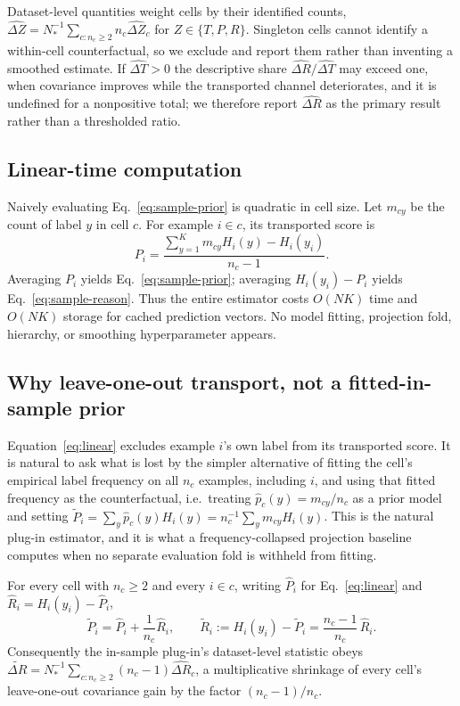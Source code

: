Dataset-level quantities weight cells by their identified counts,
$\widehat{\Delta Z}=N_*^{-1}\sum_{c:n_c\ge2}n_c\widehat{\Delta Z}_c$ for $Z\in\{T,P,R\}$.
Singleton cells cannot identify a within-cell counterfactual, so we exclude and report them
rather than inventing a smoothed estimate. If $\widehat{\Delta T}>0$ the descriptive share
$\widehat{\Delta R}/\widehat{\Delta T}$ may exceed one, when covariance improves while the
transported channel deteriorates, and it is undefined for a nonpositive total; we therefore
report $\widehat{\Delta R}$ as the primary result rather than a thresholded ratio.

\subsection{Linear-time computation}\label{sec:efficient}

Naively evaluating Eq.~\eqref{eq:sample-prior} is quadratic in cell size. Let $m_{cy}$
be the count of label $y$ in cell $c$. For example $i\in c$, its transported score is
\begin{equation}
P_i=\frac{\sum_{y=1}^K m_{cy}H_i(y)-H_i(y_i)}{n_c-1}.
\label{eq:linear}
\end{equation}
Averaging $P_i$ yields Eq.~\eqref{eq:sample-prior}; averaging
$H_i(y_i)-P_i$ yields Eq.~\eqref{eq:sample-reason}. Thus the entire estimator costs
$O(NK)$ time and $O(NK)$ storage for cached prediction vectors. No model fitting,
projection fold, hierarchy, or smoothing hyperparameter appears.

\subsection{Why leave-one-out transport, not a fitted-in-sample prior}\label{sec:attenuation}

Equation~\eqref{eq:linear} excludes example $i$'s own label from its transported score.
It is natural to ask what is lost by the simpler alternative of fitting the cell's
empirical label frequency on all $n_c$ examples, including $i$, and using that fitted
frequency as the counterfactual, i.e.\ treating $\hat p_c(y)=m_{cy}/n_c$ as a prior model
and setting $\tilde P_i=\sum_y \hat p_c(y)H_i(y)=n_c^{-1}\sum_y m_{cy}H_i(y)$. This is
the natural plug-in estimator, and it is what a frequency-collapsed projection baseline
computes when no separate evaluation fold is withheld from fitting.

\begin{proposition}\label{prop:attenuate}
For every cell with $n_c\ge2$ and every $i\in c$, writing $\hat P_i$ for
Eq.~\eqref{eq:linear} and $\hat R_i=H_i(y_i)-\hat P_i$,
\begin{equation}
\tilde P_i=\hat P_i+\frac1{n_c}\hat R_i,
\qquad
\tilde R_i:=H_i(y_i)-\tilde P_i=\frac{n_c-1}{n_c}\,\hat R_i.
\label{eq:attenuation}
\end{equation}
Consequently the in-sample plug-in's dataset-level statistic obeys
$\widetilde{\Delta R}=N_*^{-1}\sum_{c:n_c\ge2}(n_c-1)\widehat{\Delta R}_c$, a
multiplicative shrinkage of every cell's leave-one-out covariance gain by the factor
$(n_c-1)/n_c$.
\end{proposition}

